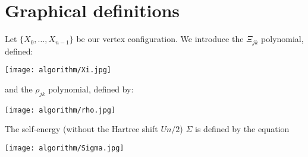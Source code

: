 \section{Graphical definitions}
Let $\{X_0,\dots,X_{n-1}\}$ be our vertex configuration.
We introduce the $\Xi_{jk}$ polynomial, defined:
\begin{center}
  \texttt{[image: algorithm/Xi.jpg]}
  \label{figure_Xi}
\end{center}
and the $\rho_{jk}$ polynomial, defined by:
\begin{center}
  \texttt{[image: algorithm/rho.jpg]}
  \label{figure_rho}
\end{center}
The self-energy (without the Hartree shift $Un/2$) $\Sigma$ is defined by the equation
\begin{center}
  \texttt{[image: algorithm/Sigma.jpg]}
  \label{figure_sigma}
\end{center}


